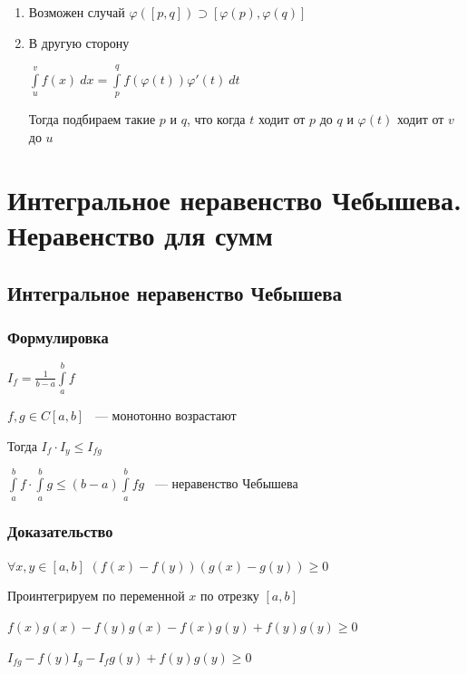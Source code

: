 \documentclass{article}
\begin{document}
			\begin{enumerate}

				\item Возможен случай $\varphi([p, q]) \supset [\varphi(p), \varphi(q)]$

				\item В другую сторону

					$\int\limits^v_u f(x) \ dx = \int\limits^q_p f(\varphi(t))\varphi'(t) \ dt$

					Тогда подбираем такие $p$ и $q$, что когда $t$ ходит от $p$ до $q$ и $\varphi(t)$ ходит от $v$ до $u$

			\end{enumerate}
	\newpage
	
	\section{Интегральное неравенство Чебышева. Неравенство для сумм}
	
		\subsection{Интегральное неравенство Чебышева}
		
            \subsubsection{Формулировка}
		
                $I_f = \frac{1}{b - a} \int\limits^b_a f$
		
                $f, g \in C[a, b]$ ~--- монотонно возрастают
			
                Тогда $I_f \cdot I_y \leq I_{fg}$
		
                $\int\limits^b_a f \cdot \int\limits^b_a g \leq (b - a) \int\limits^b_a fg$ ~--- неравенство Чебышева
		
            \subsubsection{Доказательство}
		
                $\forall x, y \in [a, b]$ $(f(x) - f(y))(g(x)-g(y)) \geq 0$
			
                Проинтегрируем по переменной $x$ по отрезку $[a, b]$
			
                $f(x)g(x) - f(y)g(x) - f(x)g(y) + f(y)g(y) \geq 0$
			
                $I_{fg} - f(y)I_g - I_f g(y) + f(y)g(y) \geq 0$
			
\end{document}
